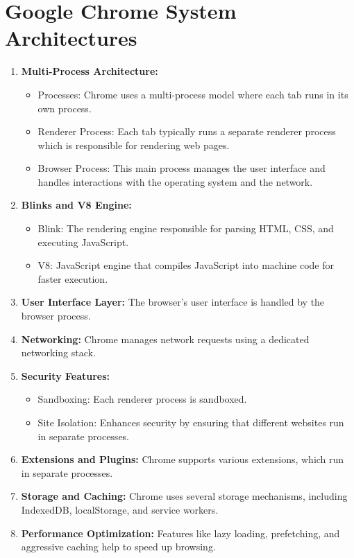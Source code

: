 \documentclass[a4paper,12pt]{article}
\begin{document}
\section{Google Chrome System Architectures}
\begin{enumerate}
    \item \textbf{Multi-Process Architecture:}
    \begin{itemize}
        \item Processes: Chrome uses a multi-process model where each tab runs in its own process.
        \item Renderer Process: Each tab typically runs a separate renderer process which is responsible for rendering web pages.
        \item Browser Process: This main process manages the user interface and handles interactions with the operating system and the network.
    \end{itemize}
    \item \textbf{Blinks and V8 Engine:}
    \begin{itemize}
        \item Blink: The rendering engine responsible for parsing HTML, CSS, and executing JavaScript.
        \item V8: JavaScript engine that compiles JavaScript into machine code for faster execution.
    \end{itemize}
    \item \textbf{User Interface Layer:} The browser's user interface is handled by the browser process.
    \item \textbf{Networking:} Chrome manages network requests using a dedicated networking stack.
    \item \textbf{Security Features:}
    \begin{itemize}
        \item Sandboxing: Each renderer process is sandboxed.
        \item Site Isolation: Enhances security by ensuring that different websites run in separate processes.
    \end{itemize}
    \item \textbf{Extensions and Plugins:} Chrome supports various extensions, which run in separate processes.
    \item \textbf{Storage and Caching:} Chrome uses several storage mechanisms, including IndexedDB, localStorage, and service workers.
    \item \textbf{Performance Optimization:} Features like lazy loading, prefetching, and aggressive caching help to speed up browsing.
\end{enumerate}
\end{document}
